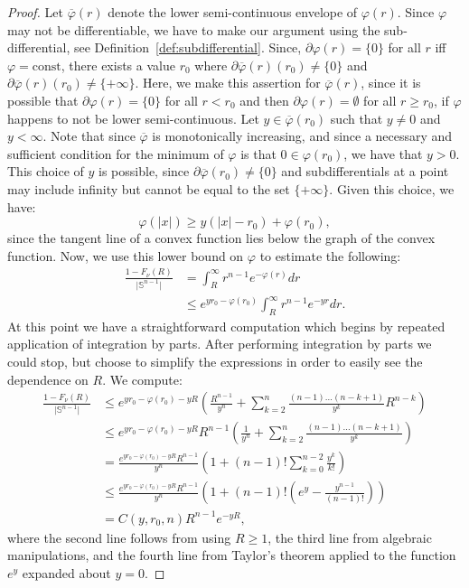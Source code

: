 \documentclass{amsart}
\theoremstyle{lemma}
\theoremstyle{remark}
\begin{document}
\begin{proof}
Let $\overline{\varphi}(r)$ denote the lower semi-continuous envelope of $\varphi(r)$. Since $\varphi$ may not be differentiable, we have to make our argument using the sub-differential, see Definition~\ref{def:subdifferential}. Since, $\partial \varphi(r) = \{ 0 \}$ for all $r$ iff $\varphi = \text{const}$, there exists a value $r_0$ where $\partial \overline{\varphi}(r)(r_0) \neq \{ 0 \}$ and $\partial \overline{\varphi}(r)(r_0) \neq \{ +\infty \}$. Here, we make this assertion for $\overline{\varphi}(r)$, since it is possible that $\partial \varphi(r) = \{ 0 \}$ for all $r<r_0$ and then $\partial \varphi(r) = \emptyset$ for all $r\geq r_0$, if $\varphi$ happens to not be lower semi-continuous. Let $y \in \overline{\varphi}(r_0)$ such that $y \neq 0$ and $y < \infty$. Note that since $\overline{\varphi}$ is monotonically increasing, and since a necessary and sufficient condition for the minimum of $\varphi$ is that $0 \in \varphi(r_0)$, we have that $y>0$. This choice of $y$ is possible, since $\partial \overline{\varphi}(r_0) \neq \{ 0\}$ and subdifferentials at a point may include infinity but cannot be equal to the set $\{ +\infty \}$. Given this choice, we have:
\begin{equation}
\varphi(\vert x \vert) \geq y(\vert x \vert - r_0)+ \varphi(r_0),
\end{equation}
since the tangent line of a convex function lies below the graph of the convex function. Now, we use this lower bound on $\varphi$ to estimate the following:
\begin{align}
\frac{1 - F_{\nu}(R)}{\vert \mathbb{S}^{n-1} \vert} &= \int_{R}^{\infty} r^{n-1}e^{-\varphi(r)}dr \\
&\leq e^{yr_0-\varphi(r_0)} \int_{R}^{\infty} r^{n-1}e^{-yr}dr.
\end{align}
At this point we have a straightforward computation which begins by repeated application of integration by parts. After performing integration by parts we could stop, but choose to simplify the expressions in order to easily see the dependence on $R$. We compute:
\begin{align}\label{eq:radiallogconcave}
\frac{1 - F_{\nu}(R)}{\vert \mathbb{S}^{n-1} \vert} &\leq e^{yr_0-\varphi(r_0) - yR} \left( \frac{R^{n-1}}{y^n} +\sum_{k=2}^{n} \frac{(n-1) \dots (n-k+1)}{y^{k}} R^{n-k} \right) \\
&\leq e^{yr_0-\varphi(r_0) - yR} R^{n-1} \left( \frac{1}{y^n} +\sum_{k=2}^{n} \frac{(n-1) \dots (n-k+1)}{y^{k}} \right) \\
&=\frac{e^{yr_0-\varphi(r_0) - yR} R^{n-1}}{y^n} \left( 1 + (n-1)! \sum_{k=0}^{n-2}\frac{y^k}{k!} \right) \\
&\leq \frac{e^{yr_0-\varphi(r_0) - yR} R^{n-1}}{y^n} \left( 1 + (n-1)! \left(e^y - \frac{y^{n-1}}{(n-1)!} \right) \right) \\
&=C(y, r_0 ,n) R^{n-1}e^{-yR},
\end{align}
where the second line follows from using $R \geq 1$, the third line from algebraic manipulations, and the fourth line from Taylor's theorem applied to the function $e^y$ expanded about $y = 0$.
\end{proof}
\end{document}
